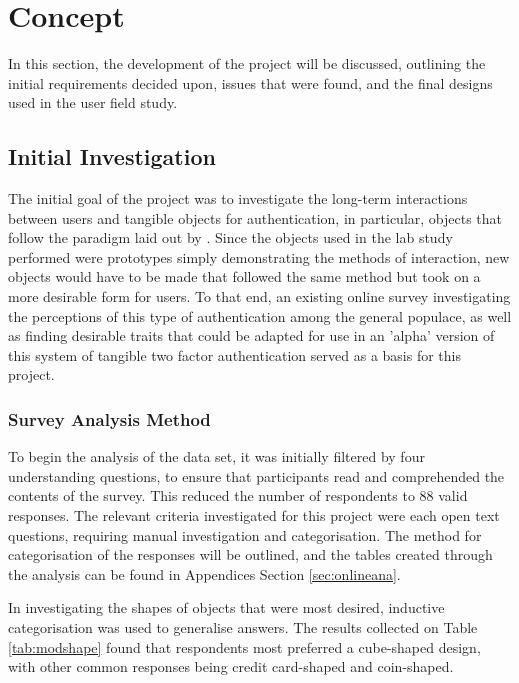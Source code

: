 \documentclass{l4proj}
\begin{document}
\chapter{Concept}

In this section, the development of the project will be discussed, outlining the initial requirements decided upon, issues that were found, and the final designs used in the user field study.

\section{Initial Investigation}

The initial goal of the project was to investigate the long-term interactions between users and tangible objects for authentication, in particular, objects that follow the paradigm laid out by \cite{marky20203d}. Since the objects used in the lab study performed were prototypes simply demonstrating the methods of interaction, new objects would have to be made that followed the same method but took on a more desirable form for users. To that end, an existing online survey investigating the perceptions of this type of authentication among the general populace, as well as finding desirable traits that could be adapted for use in an 'alpha' version of this system of tangible two factor authentication served as a basis for this project.

\subsection{Survey Analysis Method}

To begin the analysis of the data set, it was initially filtered by four understanding questions, to ensure that participants read and comprehended the contents of the survey. This reduced the number of respondents to 88 valid responses. The relevant criteria investigated for this project were each open text questions, requiring manual investigation and categorisation. The method for categorisation of the responses will be outlined, and the tables created through the analysis can be found in Appendices Section \ref{sec:onlineana}.

In investigating the shapes of objects that were most desired, inductive categorisation was used to generalise answers. The results collected on Table \ref{tab:modshape} found that respondents most preferred a cube-shaped design, with other common responses being credit card-shaped and coin-shaped.
\end{document}
